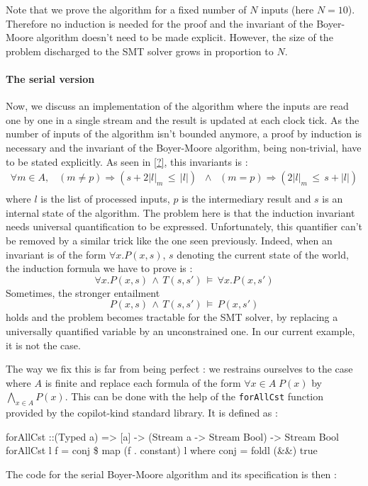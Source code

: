 Note that we prove the algorithm for a fixed number of $N$ inputs (here $N=10$). Therefore no induction is needed for the proof and the invariant of the Boyer-Moore algorithm doesn't need to be made explicit. However, the size of the problem discharged to the SMT solver grows in proportion to $N$.


\paragraph{The serial version} Now, we discuss an implementation of the algorithm where the inputs are read one by one in a single stream and the result is updated at each clock tick. As the number of inputs of the algorithm isn't bounded anymore, a proof by induction is necessary and the invariant of the Boyer-Moore algorithm, being non-trivial, have to be stated explicitly. As seen in \ref{?}, this invariants is :
\[ \begin{array}{c}
\forall m \in A, \;\;\; \left(m \neq p\right) \Longrightarrow \left( s + 2|l|_m \,\leq\, |l| \right) \;\; \wedge \;\; \left(m = p\right) \Longrightarrow \left( 2|l|_m \,\leq\, s + |l| \right)
\\

\end{array} \]
where $l$ is the list of processed inputs, $p$ is the intermediary result and $s$ is an internal state of the algorithm. The problem here is that the induction invariant needs universal quantification to be expressed. Unfortunately, this quantifier can't be removed by a similar trick like the one seen previously. Indeed, when an invariant is of the form $\forall x. P(x, s)$, $s$ denoting the current state of the world, the induction formula we have to prove is :
\[ \forall x. P(x, s) \,\wedge\, T\left(s, s' \right) \,\models\, \forall x. P(x, s') \]
Sometimes, the stronger entailment 
\[ P(x, s) \,\wedge\, T\left(s, s' \right) \,\models\, P(x, s') \]
holds and the problem becomes tractable for the SMT solver, by replacing a universally quantified variable by an unconstrained one. In our current example, it is not the case. 


The way we fix this is far from being perfect : we restrains ourselves to the case where $A$ is finite and replace each formula of the form $\forall x \in A \; P(x)$ by $\bigwedge_{x \in A} P(x)$. This can be done with the help of the \texttt{forAllCst} function provided by the copilot-kind standard library. It is defined as :
\begin{code}
forAllCst ::(Typed a) => [a] -> (Stream a -> Stream Bool) -> Stream Bool
forAllCst l f = conj \$ map (f . constant) l
  where conj = foldl (&&) true
\end{code}
The code for the serial Boyer-Moore algorithm and its specification is then :

